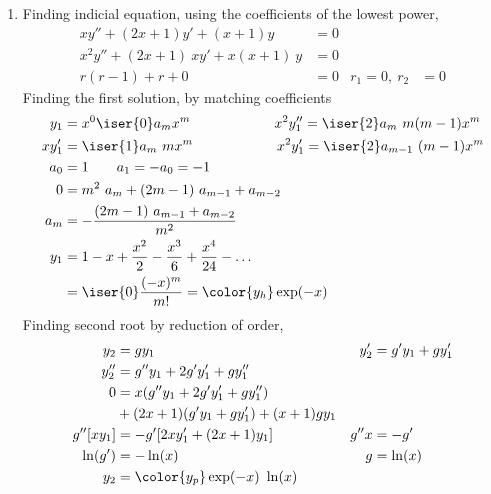 \begin{enumerate}
    \item Finding indicial equation, using the coefficients of the lowest power,
          \begin{align}
              x y'' + (2x+1)y' + (x+1)y         & = 0   \\
              x^2 y'' + (2x+1)\ xy' + x(x+1)\ y & = 0   \\
              r(r - 1) + r + 0                  & = 0 &
              r_1 = 0,\ r_2                     & = 0
          \end{align}
          Finding the first solution, by matching coefficients
          \begin{align}
              y_1   & = x^0 \iser{0} a_m x^m
              \qquad\qquad\qquad x^2 y_1'' = \iser{2} a_m\ m(m-1)x^m                   \\
              xy_1' & = \iser{1} a_m\ m x^{m}
              \qquad\qquad\qquad x^2y_1' = \iser{2} a_{m-1}\ (m-1) x^m                 \\
              a_0   & = 1  \qquad a_1 = -a_0 = -1                                      \\
              0     & = m^2\ a_m + (2m-1)\ a_{m-1} + a_{m-2}                           \\
              a_m   & = -\frac{(2m-1)\ a_{m-1} + a_{m-2}}{m^2}                         \\
              y_1   & = 1 - x + \frac{x^2}{2} - \frac{x^3}{6} + \frac{x^4}{24} - \dots \\
                    & = \iser{0} \frac{(-x)^m}{m!} = \color{y_h} \exp(-x)
          \end{align}
          Finding second root by reduction of order,
          \begin{align}
              y_2       & = gy_1                              &
              y_2'      & = g'y_1 + gy_1'                       \\
              y_2''     & = g''y_1 + 2g'y_1' + gy_1''           \\
              0         & = x(g''y_1 + 2g'y_1' + gy_1'')        \\
                        & + (2x+1)(g'y_1 + gy_1') + (x+1)gy_1   \\
              g''[xy_1] & = -g' [2xy_1' + (2x+1)y_1]          &
              g''x      & = -g'                                 \\
              \ln(g')   & = -\ln(x)                           &
              g         & = \ln(x)                              \\
              y_2       & = \color{y_p} \exp(-x)\ \ln(x)
          \end{align}


\end{enumerate}
